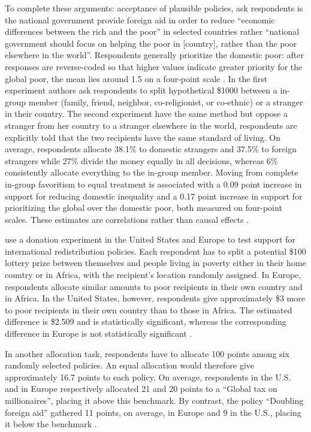 \documentclass[11pt,a4paper]{article}
\begin{document}
To complete these arguments: acceptance of plausible policies, \citet{cappelen_universalism_2025} ask respondents is the national government provide foreign aid in order to reduce ``economic differences between the rich and the poor'' in selected countries rather ``national government should focus on helping the poor in [country], rather than the poor elsewhere in the world''. Respondents generally prioritize the domestic poor: after responses are reverse-coded so that higher values indicate greater priority for the global poor, the mean lies around 1.5 on a four-point scale \citep[Figure 7B]{cappelen_universalism_2025}.
In the first experiment authors ask respondents to split hypothetical \$1000 between a in-group member (family, friend, neighbor, co-religionist, or co-ethnic) or a stranger in their country. The second experiment have the same method but oppose a stranger from her country to a stranger elsewhere in the world, respondents are explicitly told that the two recipients have the same standard of living. On average, respondents allocate 38.1\% to domestic strangers and 37.5\% to foreign strangers while 27\% divide the money equally in all decisions, whereas 6\% consistently allocate everything to the in-group member. Moving from complete in-group favoritism to equal treatment is associated with a 0.09 point increase in support for reducing domestic inequality and a 0.17 point increase in support for prioritizing the global over the domestic poor, both measured on four-point scales. These estimates are correlations rather than causal effects \cite[Table 1]{cappelen_universalism_2025}.

\citet{fabre_majority_2025} use a donation experiment in the United States and Europe to test support for international redistribution policies. Each respondent has to split a potential \$100 lottery prize between themselves and people living in poverty either in their home country or in Africa, with the recipient's location randomly assigned. In Europe, respondents allocate similar amounts to poor recipients in their own country and in Africa. In the United States, however, respondents give approximately \$3 more to poor recipients in their own country than to those in Africa. The estimated difference is \$2.509 and is statistically significant, whereas the corresponding difference in Europe is not statistically significant \citep[Figure S13 \& Table ED2]{fabre_majority_2025_si}.

In another allocation task, respondents have to allocate 100 points among six randomly selected policies. An equal allocation would therefore give approximately 16.7 points to each policy. On average, respondents in the U.S. and in Europe respectively allocated 21 and 20 points to a ``Global tax on millionaires'', placing it above this benchmark. By contrast, the policy ``Doubling foreign aid'' gathered 11 points, on average, in Europe and 9 in the U.S., placing it below the benchmark \citep[Figure S30]{fabre_majority_2025_si}.
\end{document}
